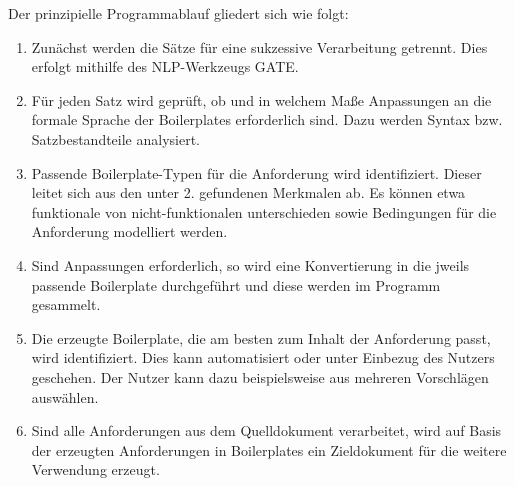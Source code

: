 \documentclass[12pt]{report}
\begin{document}
Der prinzipielle Programmablauf gliedert sich wie folgt:
\begin{enumerate}
\item Zunächst werden die Sätze für eine sukzessive Verarbeitung getrennt. Dies erfolgt mithilfe des NLP-Werkzeugs GATE.
\item Für jeden Satz wird geprüft, ob und in welchem Maße Anpassungen an die formale Sprache der Boilerplates erforderlich sind. Dazu werden Syntax bzw. Satzbestandteile analysiert.
\item Passende Boilerplate-Typen für die Anforderung wird identifiziert. Dieser leitet sich aus den unter 2. gefundenen Merkmalen ab. Es können etwa funktionale von nicht-funktionalen unterschieden sowie Bedingungen für die Anforderung modelliert werden.
\item Sind Anpassungen erforderlich, so wird eine Konvertierung in die jweils passende Boilerplate durchgeführt und diese werden im Programm gesammelt. 
\item Die erzeugte Boilerplate, die am besten zum Inhalt der Anforderung passt, wird identifiziert. Dies kann automatisiert oder unter Einbezug des Nutzers geschehen. Der Nutzer kann dazu beispielsweise aus mehreren Vorschlägen auswählen.
\item Sind alle Anforderungen aus dem Quelldokument verarbeitet, wird auf Basis der erzeugten Anforderungen in Boilerplates ein Zieldokument für die weitere Verwendung erzeugt.
\end{enumerate}
\end{document}
